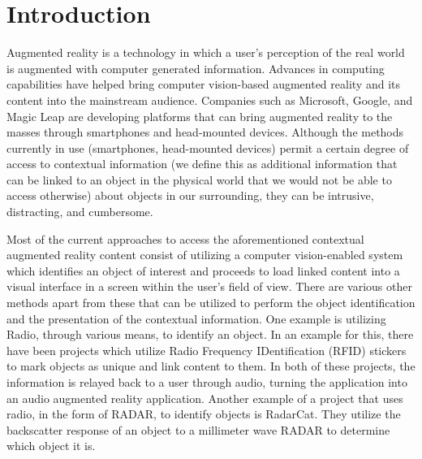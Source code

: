 \section{Introduction}

Augmented reality is a technology in which a user's perception of the real world is augmented with computer generated information. Advances in computing capabilities have helped bring computer vision-based augmented reality and its content into the mainstream audience. Companies such as Microsoft, Google, and Magic Leap are developing platforms that can bring augmented reality to the masses through smartphones and head-mounted devices. Although the methods currently in use (smartphones, head-mounted devices) permit a certain degree of access to contextual information (we define this as additional information that can be linked to an object in the physical world that we would not be able to access otherwise) about objects in our surrounding, they can be intrusive, distracting, and cumbersome. 

Most of the current approaches to access the aforementioned contextual augmented reality content consist of utilizing a computer vision-enabled system which identifies an object of interest and proceeds to load linked content into a visual interface in a screen within the user's field of view. There are various other methods apart from these that can be utilized to perform the object identification and the presentation of the contextual information. One example is utilizing Radio, through various means, to identify an object. In an example for this, there have been projects which utilize Radio Frequency IDentification (RFID) stickers to mark objects as unique and link content to them\cite{amores_benavides_maes_2015}\cite{feldman_tapia_sadi_maes_schmandt}. In both of these projects, the information is relayed back to a user through audio, turning the application into an audio augmented reality application. Another example of a project that uses radio, in the form of RADAR, to identify objects is RadarCat\cite{yeo_flamich_schrempf_harris-birtill_quigley_2016}. They utilize the backscatter response of an object to a millimeter wave RADAR to determine which object it is. 


